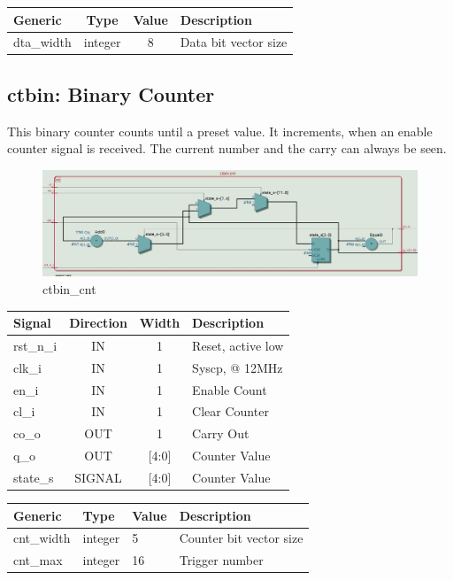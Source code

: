 \documentclass[12pt,a4 paper] {report}
\begin{document}
\begin{center}
	\begin{tabular}{| p{2cm} | c | c | p{5cm} |}
	\hline
	\textbf{Generic} & \textbf{Type} & \textbf{Value} & \textbf{Description} \\
	\hline
	dta\_width & integer & 8 & Data bit vector size \\
	\hline
	\end{tabular}
\end{center}

\newpage

\subsection{ctbin: Binary Counter}
This binary counter counts until a preset value. It increments, when an enable counter signal is received. The current 
number and the carry can always be seen.
\begin{figure}[h]
	\centering	
	\includegraphics[scale=0.3]{../png/ctbin_cnt.png}
	\caption{ctbin\_cnt}
\end{figure}
\begin{center}
	\begin{tabular}{ | p{2cm} | c | c | p{5cm} |}
		\hline
		\textbf{Signal} & \textbf{Direction} & \textbf{Width} & \textbf{Description} \\
		\hline
		\hline
 		 rst\_n\_i & IN & 1 & Reset, active low \\
 		 \hline
		clk\_i & IN & 1 & Syscp, @ 12MHz \\
		\hline
		en\_i & IN & 1 & Enable Count \\
		\hline
		cl\_i & IN & 1 & Clear Counter \\
		\hline
		co\_o & OUT & 1 & Carry Out \\
		\hline
		q\_o & OUT & [4:0] & Counter Value \\
		\hline
		\hline
		state\_s & SIGNAL & [4:0] & Counter Value \\
		\hline
	\end{tabular}
\end{center}
\begin{center}
	\begin{tabular}{| p{2cm} | p{2cm} | p{2cm} | p{5cm} |}
		\hline
		\textbf{Generic} & \textbf{Type} & \textbf{Value} & \textbf{Description} \\
		\hline
 		cnt\_width & integer & 5 & Counter bit vector size \\
		\hline
		cnt\_max & integer & 16 & Trigger number \\
		\hline
	\end{tabular}	
\end{center}
\end{document}

